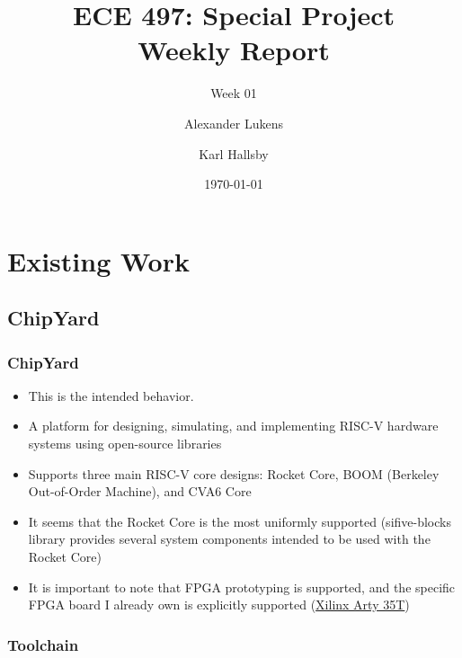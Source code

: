 \documentclass{weeklyslides}
\title[Weekly Report]{ECE 497: Special Project \\ Weekly Report}
\subtitle{Week 01}
\author{Alexander Lukens \and Karl Hallsby}
\institute{Illinois Institute of Technology}
\date{\today}
\begin{document}
\begin{frame}
  \titlepage{}
\end{frame}

\section{Existing Work}\label{sec:Existing Work}
\subsection{ChipYard}\label{subsec:ChipYard}
\begin{frame}
  \frametitle{ChipYard}
  \begin{itemize}
  \item This is the intended behavior.
  \item A platform for designing, simulating, and implementing RISC-V hardware systems using open-source libraries
  \item Supports three main RISC-V core designs: Rocket Core, BOOM (Berkeley Out-of-Order Machine), and CVA6 Core
  \item It seems that the Rocket Core is the most uniformly supported (sifive-blocks library provides several system components intended to be used with the Rocket Core)
  \item It is important to note that FPGA prototyping is supported, and the specific FPGA board I already own is explicitly supported (\href{https://www.xilinx.com/products/boards-and-kits/arty.html}{Xilinx Arty 35T})
  \end{itemize}

\end{frame}

\subsubsection{Toolchain}\label{subsubsec:Toolchain} %
\begin{frame}
  \frametitle{}
\end{frame}
\end{document}
